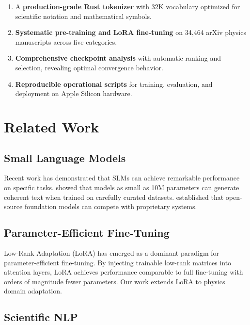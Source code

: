 \documentclass[11pt,a4paper,twocolumn]{article}
\theoremstyle{plain}
\theoremstyle{definition}
\begin{document}
\begin{enumerate}[leftmargin=*,itemsep=0pt]
    \item A \textbf{production-grade Rust tokenizer} with 32K vocabulary 
    optimized for scientific notation and mathematical symbols.
    
    \item \textbf{Systematic pre-training and LoRA fine-tuning} on 
    34,464 arXiv physics manuscripts across five categories.
    
    \item \textbf{Comprehensive checkpoint analysis} with automatic 
    ranking and selection, revealing optimal convergence behavior.
    
    \item \textbf{Reproducible operational scripts} for training, 
    evaluation, and deployment on Apple Silicon hardware.
\end{enumerate}

\section{Related Work}

\subsection{Small Language Models}

Recent work has demonstrated that SLMs can achieve remarkable 
performance on specific tasks. \citet{eldan2023tinystories} showed 
that models as small as 10M parameters can generate coherent text 
when trained on carefully curated datasets. \citet{touvron2023llama} 
established that open-source foundation models can compete with 
proprietary systems.

\subsection{Parameter-Efficient Fine-Tuning}

Low-Rank Adaptation (LoRA) \citep{hu2021lora} has emerged as a 
dominant paradigm for parameter-efficient fine-tuning. By injecting 
trainable low-rank matrices into attention layers, LoRA achieves 
performance comparable to full fine-tuning with orders of magnitude 
fewer parameters. Our work extends LoRA to physics domain adaptation.

\subsection{Scientific NLP}
\end{document}
